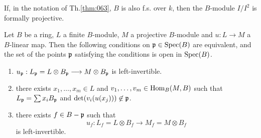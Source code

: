 \documentclass[../main]{subfiles}
\begin{document}
\begin{corollary}
If, in the notation of Th.\ref{thm:063}, $B$ is also f.s. over $k$, then the $B$-module $I/I^2$ is formally projective. 
\end{corollary}

\begin{parlemma}
\label{lem:29.3}
Let $B$ be a ring, $L$ a finite $B$-module, $M$ a projective $B$-module and $u : L \longrightarrow M$ a $B$-linear map. Then the following conditions on $\mathfrak{p} \in \operatorname{Spec}(B)$ are equivalent, and the set of the points $\mathfrak{p}$ satisfying the conditions is open in $\operatorname{Spec}(B)$. 

\begin{enumerate}
    \item[(1)] $u_{\mathfrak{p}} : L_{\mathfrak{p}} = L \otimes B_{\mathfrak{p}} \longrightarrow M \otimes B_{\mathfrak{p}}$ is left-invertible.
    \item[(2)] there exists $x_1, \ldots, x_m \in L$ and $v_1, \dots, v_m \in \operatorname{Hom}_B(M, B)$ such that \newline $L_{\mathfrak{p}} = \sum x_i B_{\mathfrak{p}}$ and $\det(v_i(u(x_j))) \not \in \mathfrak{p}$.
    \item[(3)] there exists $f \in B - \mathfrak{p}$ such that \[u_f : L_f = L \otimes B_f \longrightarrow M_f = M \otimes B_f\] is left-invertible. 
\end{enumerate}
\end{parlemma}
\end{document}
